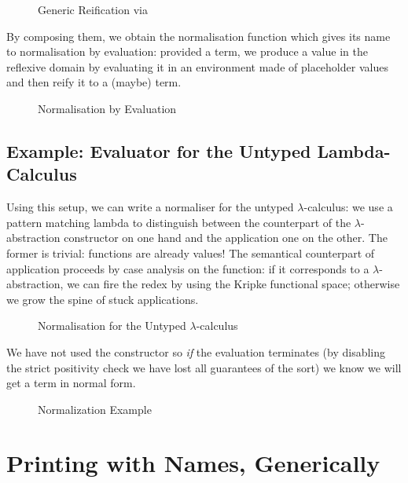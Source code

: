 \begin{figure}[h]
\caption{Generic Reification via }
\end{figure}

By composing them, we obtain the normalisation function which gives its name
to normalisation by evaluation: provided a term, we produce a value in the
reflexive domain by evaluating it in an environment made of placeholder values
and then reify it to a (maybe) term.

\begin{figure}[h]
\caption{Normalisation by Evaluation}
\end{figure}

\subsection{Example: Evaluator for the Untyped Lambda-Calculus}

Using this setup, we can write a normaliser for the untyped $\lambda$-calculus:
we use a pattern matching lambda to distinguish between the counterpart of the
$\lambda$-abstraction constructor on one hand and the application one on the other.
The former is trivial: functions are already values! The semantical counterpart of
application proceeds by case analysis on the function: if it corresponds
to a $\lambda$-abstraction, we can fire the redex by using the Kripke functional space;
otherwise we grow the spine of stuck applications.

\begin{figure}[h]
\caption{Normalisation for the Untyped $\lambda$-calculus}
\end{figure}

We have not used the  constructor so \emph{if} the evaluation terminates
(by disabling the strict positivity check we have lost all guarantees of the sort)
we know we will get a term in normal form.


\begin{figure}[h]
\caption{Normalization Example}
\end{figure}


\section{Printing with Names, Generically}

